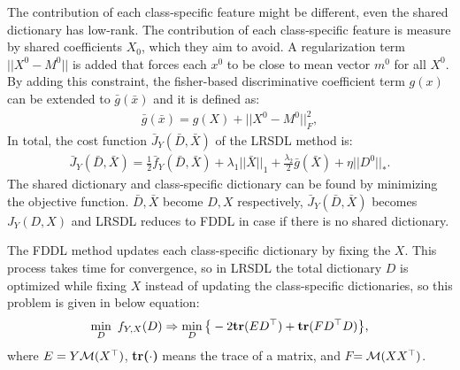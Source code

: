 The contribution of each class-specific feature might be different, even the shared dictionary has low-rank. The contribution of each class-specific feature is measure by shared coefficients $X_0$, which they aim to avoid. A regularization term $||X^0 - M^0||$ is added that forces each $x^0$ to be close to mean vector $m^0$ for all $X^0$. By adding this constraint, the fisher-based discriminative coefficient term $g(x)$ can be extended to $\bar{g}(\bar{x})$ and it is defined as:
\begin{equation}
\begin{aligned}
	\bar{g}(\bar{x}) = g(X) +||X^0-M^0||_F^2,
	\end{aligned}
	\label{extendg(x)}
\end{equation}
In total, the cost function $\bar{J}_Y(\bar{D},\bar{X})$ of the LRSDL method is: 
\begin{equation}
\begin{aligned}
\bar{J}_Y(\bar{D},\bar{X}) = \frac{1}{2}\bar{f}_Y(\bar{D},\bar{X})+\lambda_1||\bar{X}||_1 + \frac{\lambda_2}{2}\bar{g}(\bar{X}) + \eta||D^0||_*.
\end{aligned}
\label{lrsdlcostfunction}
\end{equation}
The shared dictionary and class-specific dictionary can be found by minimizing the objective function. $\bar{D}, \bar{X}$ become $D, X$ respectively, $\bar{J}_Y(\bar{D},\bar{X})$ becomes $J_Y({D},{X})$ and LRSDL reduces to FDDL in case if there is no shared dictionary.

The FDDL method updates each class-specific dictionary by fixing the $X$. This process takes time for convergence, so in LRSDL the total dictionary $D$ is optimized while fixing $X$ instead of updating the class-specific dictionaries, so this problem is given in below equation:
\begin{equation}
\begin{aligned}
\min_D \ f_{Y,X}(D) \Rightarrow \min_D\big\{-2 \textbf{tr}(ED^\top) +\textbf{tr}(FD^\top D)\big\},
\end{aligned}
\label{eq:DL1}
\end{equation}
where $E= Y \mathcal{M}(X^\top) $, \textbf{tr($\cdot$)} means the trace of a matrix, and ${F}$$ = \mathcal{M}(XX^\top)$.

